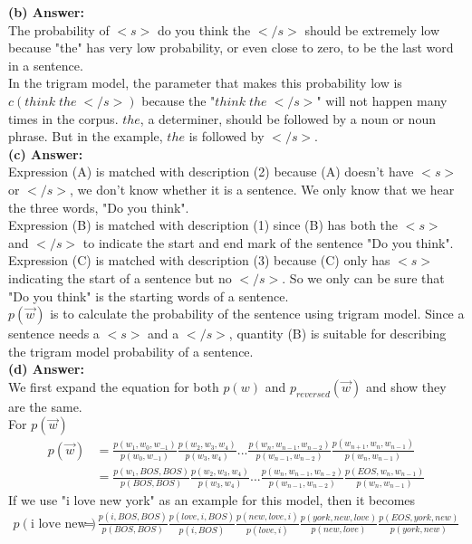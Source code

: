 \documentclass{article}
\begin{document}
\noindent
\textbf{(b) Answer:}\\
The probability of $<s>$ do you think the $</s>$ should be extremely low because "the" has very low probability, or even close to zero, to be the last word in a sentence.\\

\noindent
In the trigram model, the parameter that makes this probability low is $c(think\;the\;</s>)$ because the "$think\;the\;</s>$" will not happen many times in the corpus. $the$, a determiner, should be followed by a noun or noun phrase. But in the example, $the$ is followed by $</s>$.\\

\noindent
\textbf{(c) Answer:}\\
Expression (A) is matched with description (2) because (A) doesn't have $<s>$ or $</s>$, we don't know whether it is a sentence. We only know that we hear the three words, "Do you think".\\

\noindent
Expression (B) is matched with description (1) since (B) has both the $<s>$ and $</s>$ to indicate the start and end mark of the sentence "Do you think".\\

\noindent
Expression (C) is matched with description (3) because (C) only has $<s>$ indicating the start of a sentence but no $</s>$. So we only can be sure that "Do you think" is the starting words of a sentence.\\

\noindent
$p(\vec{w})$ is to calculate the probability of the sentence using trigram model. Since a sentence needs a $<s>$ and a $</s>$, quantity (B) is suitable for describing the trigram model probability of a sentence.\\

\noindent
\textbf{(d) Answer:}\\
We first expand the equation for both $p(w)$ and $p_{reversed}(\vec{w})$ and show they are the same.\\
For $p(\vec{w})$
\begin{align*}
    p(\vec{w})
    &= \frac{p(w_1, w_0, w_{-1})}{p(w_0, w_{-1})}
       \frac{p(w_2, w_3, w_4)}{p(w_3, w_4)}...
       \frac{p(w_n, w_{n-1}, w_{n-2})}{p(w_{n-1}, w_{n-2})}
       \frac{p(w_{n+1}, w_n, w_{n-1})}{p(w_n, w_{n-1})}
    \\&= \frac{p(w_1, BOS, BOS)}{p(BOS, BOS)}
       \frac{p(w_2, w_3, w_4)}{p(w_3, w_4)}...
       \frac{p(w_n, w_{n-1}, w_{n-2})}{p(w_{n-1}, w_{n-2})}
       \frac{p(EOS, w_n, w_{n-1})}{p(w_n, w_{n-1})}       
\end{align*}
If we use "i love new york" as an example for this model, then it becomes
\begin{align*}
    p(\text{i love new york})
    &= \frac{p(i, BOS, BOS)}{p(BOS, BOS)}
       \frac{p(love, i, BOS)}{p(i, BOS)}
       \frac{p(new, love, i)}{p(love, i)}
       \frac{p(york, new, love)}{p(new, love)}
       \frac{p(EOS, york, new)}{p(york, new)}       \tag{4.d.1}
\end{align*}
\end{document}
